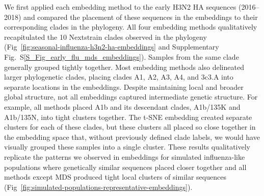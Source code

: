 \documentclass[webpdf,contemporary,large,single]{oup-authoring-template}%
\theoremstyle{thmstyleone}%
\theoremstyle{thmstyletwo}%
\theoremstyle{thmstylethree}%
\begin{document}
We first applied each embedding method to the early H3N2 HA sequences (2016--2018) and compared the placement of these sequences in the embeddings to their corresponding clades in the phylogeny.
All four embedding methods qualitatively recapitulated the 10 Nextstrain clades observed in the phylogeny (Fig~\ref{fig:seasonal-influenza-h3n2-ha-embeddings} and Supplementary Fig.~S\ref{S_Fig_early_flu_mds_embeddings}).
Samples from the same clade generally grouped tightly together.
Most embedding methods also delineated larger phylogenetic clades, placing clades A1, A2, A3, A4, and 3c3.A into separate locations in the embeddings.
Despite maintaining local and broader global structure, not all embeddings captured intermediate genetic structure.
For example, all methods placed A1b and its descendant clades, A1b/135K and A1b/135N, into tight clusters together.
The t-SNE embedding created separate clusters for each of these clades, but these clusters all placed so close together in the embedding space that, without previously defined clade labels, we would have visually grouped these samples into a single cluster.
These results qualitatively replicate the patterns we observed in embeddings for simulated influenza-like populations where genetically similar sequences placed closer together and all methods except MDS produced tight local clusters of similar sequences (Fig~\ref{fig:simulated-populations-representative-embeddings}).

\end{document}
